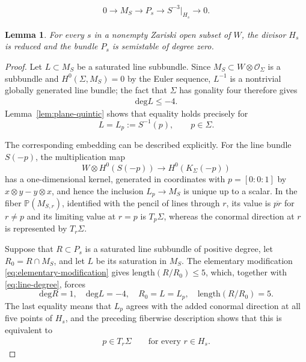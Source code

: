 \documentclass[10pt,a4paper]{amsart}
\newtheorem{lem}{Lemma}
\begin{document}
\begin{align}\label{eq:elementary-modification}
 0\longrightarrow M_S\longrightarrow P_s
 \longrightarrow S^{-3}|_{H_s}\longrightarrow0.
\end{align}

\begin{lem}\label{lem:good-section}
For every $s$ in a nonempty Zariski open subset of $W$, the divisor $H_s$ is reduced and the bundle $P_s$ is semistable of degree zero.
\end{lem}

\begin{proof}
Let $L\subset M_S$ be a saturated line subbundle.  Since
$M_S\subset W\otimes\mathcal{O}_\Sigma$ is a subbundle and
$H^0(\Sigma,M_S)=0$ by the Euler sequence, $L^{-1}$ is a nontrivial globally
generated line bundle; the fact that $\Sigma$ has gonality four therefore
gives
\begin{align}\label{eq:line-degree}
 \mathrm{deg} L\leq-4.
\end{align}
Lemma~\ref{lem:plane-quintic} shows that equality holds precisely for
\[
 L=L_p:=S^{-1}(p),\qquad p\in \Sigma.
\]

The corresponding embedding can be described explicitly.  For the line
bundle $S(-p)$, the multiplication map
\[
 W\otimes H^0(S(-p))\longrightarrow H^0(K_\Sigma(-p))
\]
has a one-dimensional kernel, generated in coordinates with
$p=[0:0:1]$ by $x\otimes y-y\otimes x$, and hence the inclusion
$L_p\to M_S$ is unique up to a scalar.  In the fiber
$\mathbb{P}(M_{S,r})$, identified with the pencil of lines through $r$, its
value is $\overline{pr}$ for $r\neq p$ and its limiting value at $r=p$ is
$T_p\Sigma$, whereas the conormal direction at $r$ is represented by
$T_r\Sigma$.

Suppose that $R\subset P_s$ is a saturated line subbundle of positive
degree, let $R_0=R\cap M_S$, and let $L$ be its saturation in $M_S$.  The
elementary modification \eqref{eq:elementary-modification} gives
$\mathrm{length}(R/R_0)\leq5$, which, together with
\eqref{eq:line-degree}, forces
\[
 \mathrm{deg} R=1,\quad \mathrm{deg} L=-4,\quad R_0=L=L_p,\quad
 \mathrm{length}(R/R_0)=5.
\]
The last equality means that $L_p$ agrees with the added conormal direction
at all five points of $H_s$, and the preceding fiberwise description shows
that this is equivalent to
\begin{align}\label{eq:bad-line}
 p\in T_r\Sigma\qquad\text{for every }r\in H_s.
\end{align}


\end{proof}
\end{document}
